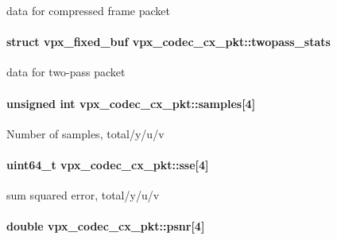 data for compressed frame packet \hypertarget{structvpx__codec__cx__pkt_a53db8576979fa7335e478eb849b256f1}{
\paragraph[{twopass\+\_\+stats}]{\setlength{\rightskip}{0pt plus 5cm}struct {\bf vpx\+\_\+fixed\+\_\+buf} vpx\+\_\+codec\+\_\+cx\+\_\+pkt\+::twopass\+\_\+stats}}\label{structvpx__codec__cx__pkt_a53db8576979fa7335e478eb849b256f1}
data for two-\/pass packet \hypertarget{structvpx__codec__cx__pkt_a4d3fc7eb2d19c5913c6f3f474e5cf77b}{
\paragraph[{samples}]{\setlength{\rightskip}{0pt plus 5cm}unsigned int vpx\+\_\+codec\+\_\+cx\+\_\+pkt\+::samples\mbox{[}4\mbox{]}}}\label{structvpx__codec__cx__pkt_a4d3fc7eb2d19c5913c6f3f474e5cf77b}
Number of samples, total/y/u/v \hypertarget{structvpx__codec__cx__pkt_ad65e918d3f26743cc7a8898b88bcb397}{
\paragraph[{sse}]{\setlength{\rightskip}{0pt plus 5cm}uint64\+\_\+t vpx\+\_\+codec\+\_\+cx\+\_\+pkt\+::sse\mbox{[}4\mbox{]}}}\label{structvpx__codec__cx__pkt_ad65e918d3f26743cc7a8898b88bcb397}
sum squared error, total/y/u/v \hypertarget{structvpx__codec__cx__pkt_a63744aeceb50355d6402d55309c151b6}{
\paragraph[{psnr}]{\setlength{\rightskip}{0pt plus 5cm}double vpx\+\_\+codec\+\_\+cx\+\_\+pkt\+::psnr\mbox{[}4\mbox{]}}}\label{structvpx__codec__cx__pkt_a63744aeceb50355d6402d55309c151b6}
